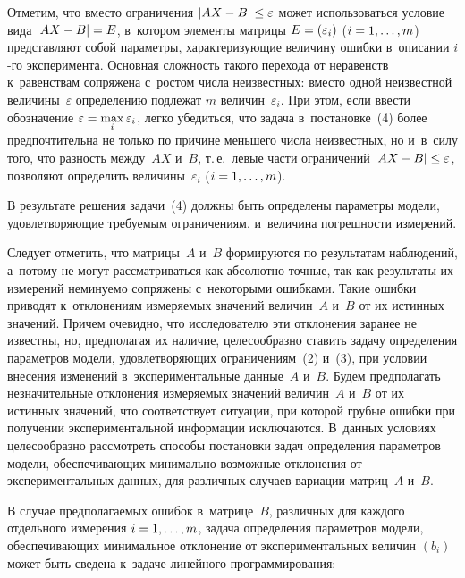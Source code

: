 \begin{multicols}{2}
  Отметим, что вместо ограничения $\vert AX-B\vert \hm\leq \varepsilon$ может
использоваться условие вида $\vert AX\hm-B\vert\hm= {E}$, в~котором
элементы матрицы ${E}\hm= (\varepsilon_i)$ ($i\hm= 1,\ldots , m$)
представляют собой параметры, характеризующие величину ошибки в~описании $i$-го эксперимента. Основная сложность такого перехода от
неравенств к~равенствам сопряжена с~ростом числа неизвестных: вместо одной
неизвестной величины~$\varepsilon$ определению подлежат $m$
величин~$\varepsilon_i$. При этом, если ввести обозначение $\varepsilon\hm=
\max\limits_i \varepsilon_i$, легко убедиться, что задача в~постановке~(4) более
предпочтительна не только по причине меньшего числа неизвестных, но
и~в~силу того, что разность между~$AX$ и~$B$, т.\,е.\ левые части
ограничений $\vert AX\hm-B\vert \hm\leq \varepsilon$, позволяют определить
величины~$\varepsilon_i$  ($i\hm= 1,\ldots , m$).

  В результате решения задачи~(4) должны быть определены параметры
модели, удовлетворяющие требуемым ограничениям, и~величина погреш\-ности
измерений.

  Следует отметить, что матрицы~$A$ и~$B$ формируются по результатам
наблюдений, а~потому не могут рассматриваться как абсолютно точные, так
как результаты их измерений неминуемо сопряжены с~некоторыми ошибками.
Такие ошибки приводят к~отклонениям измеряемых значений величин~$A$
и~$B$ от их истинных значений. Причем очевидно, что исследователю эти
отклонения заранее не известны, но, предполагая их наличие, целесообразно
ставить задачу определения параметров модели, удовлетворяющих
ограничениям~(2) и~(3), при условии внесения изменений
в~экспериментальные данные~$A$ и~$B$. Будем предполагать незначительные
отклонения измеряемых значений величин~$A$ и~$B$ от их истинных
значений, что соответствует ситуации, при которой грубые ошибки при
получении экспериментальной информации исключаются. В~данных условиях
целесообразно рассмотреть способы постановки задач определения параметров
модели, обеспечивающих минимально возможные отклонения от
экспериментальных данных, для различных случаев вариации матриц~$A$
и~$B$.

  В случае предполагаемых ошибок в~матрице~$B$, различных для каждого
отдельного измерения $i\hm= 1,\ldots ,m$, задача определения параметров
модели, обеспечивающих минимальное отклонение от экспериментальных
величин $(b_i)$ может быть сведена к~задаче линейного программирования:


\end{multicols}
